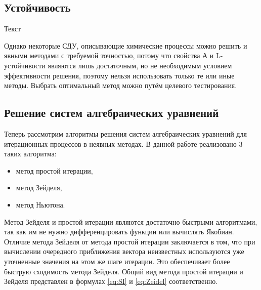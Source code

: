 \subsection{Устойчивость}

Текст


Однако некоторые СДУ, описывающие химические процессы можно решить и явными методами с требуемой точностью, потому что свойства А и
L-устойчивости являются
лишь достаточным, но не необходимым условием эффективности решения, поэтому нельзя использовать только те или иные методы. Выбрать
оптимальный метод можно путём целевого тестирования.

\subsection{Решение систем алгебраических уравнений}

Теперь рассмотрим алгоритмы решения систем алгебраических уравнений для итерационных процессов в неявных методах. В данной работе
реализовано 3 таких алгоритма:
\begin{itemize}
    \item метод простой итерации,
    \item метод Зейделя,
    \item метод Ньютона.
\end{itemize}

Метод Зейделя и простой итерации являются достаточно быстрыми алгоритмами, так как им не нужно дифференцировать функции или
вычислять Якобиан. Отличие метода Зейделя от метода простой итерации заключается в том, что при вычислении очередного приближения
вектора неизвестных используются уже уточненные значения на этом же шаге итерации. Это обеспечивает более быструю сходимость метода
Зейделя. Общий вид метода простой итерации и Зейделя представлен в формулах \ref{eq:SI} и \ref{eq:Zeidel} соответственно.

